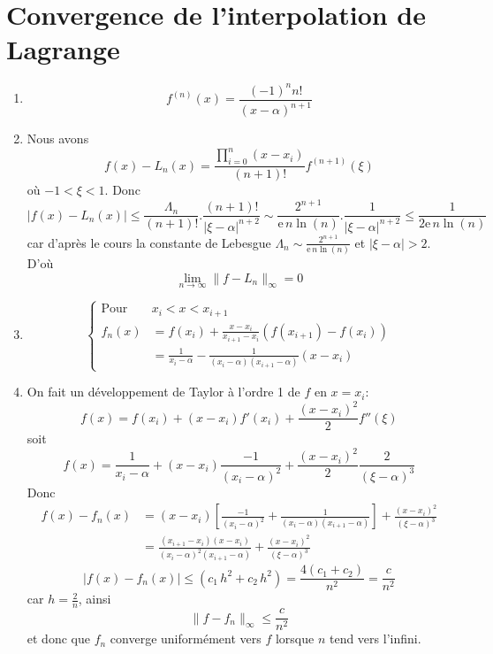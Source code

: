 \documentclass[a4paper]{article}
\begin{document}
\section{Convergence de l'interpolation de Lagrange} 
\begin{enumerate}
\item \[f^{(n)}(x)=\frac{(-1)^n n!}{(x-\alpha)^{n+1}}\]
\item Nous avons
\[f(x) - L_n(x) =\frac{\prod_{i=0}^n\left(x-x_i\right)}{(n + 1)!}f^{(n+1)}(\xi)\]
où  $-1 < \xi < 1$. Donc
\[|f(x)-L_n(x)|\leq \frac{\Lambda_n }{(n + 1)!}.\frac{ (n + 1)!}{|\xi-\alpha|^{n+2}}\sim \frac{2^{n+1}}{\mbox{e}\, n\ln(n)}.\frac{ 1}{|\xi-\alpha|^{n+2}}\leq \frac{1}{2\mbox{e}\, n\ln(n)}\]
car d'après le cours  la constante de Lebesgue $\Lambda_n \sim \frac{2^{n+1}}{\mbox{e}\, n\ln(n)} $ et $|\xi-\alpha|>2$.  
D'où
\[\lim_{n\to \infty}\|f-L_n\|_{\infty}=0\]
\item  \[\left\{\begin{array}{rl}
 \mbox{Pour } &x_i<x<x_{i+1}\\
f_n(x)&=f(x_i)+\frac{x-x_i}{x_{i+1}-x_{i}}\left(f(x_{i+1})-f(x_{i})\right)\\
 &=\frac{1}{x_i-\alpha}-\frac{1}{(x_i-\alpha)(x_{i+1}-\alpha)}(x-x_i)
\end{array}\right.
\]
\item On fait un développement de Taylor à l'ordre 1 de $f$ en $x=x_i$:
\[f(x)=f(x_i)+(x-x_i)f'(x_i)+\frac{(x-x_i)^2}{2}f''(\xi)\]
soit
\[f(x)=\frac{1}{x_i-\alpha}+(x-x_i)\frac{-1}{(x_i-\alpha)^2}+\frac{(x-x_i)^2}{2}\frac{2}{(\xi-\alpha)^{3}}\]
Donc
\[\begin{array}{ll}
f(x)-f_n(x)  &= (x-x_i)\left[\frac{-1}{(x_i-\alpha)^2}+\frac{1}{(x_i-\alpha)(x_{i+1}-\alpha)}\right]+\frac{(x-x_i)^2}{(\xi-\alpha)^{3}}\\
&= \frac{(x_{i+1}-x_i)(x-x_i)}{(x_i-\alpha)^2(x_{i+1}-\alpha)}+\frac{(x-x_i)^2}{(\xi-\alpha)^{3}}
\end{array}
\]
\[|f(x)-f_n(x)|\leq (c_1\,h^2+c_2\,h^2)=\frac{4(c_1+c_2)}{n^2}=\frac{c}{n^2}\]
car $h=\frac 2n$, ainsi
\[\|f-f_n\|_{ \infty}\leq \frac c{n^2}\]
et donc que $f_n$ converge uniformément vers $f$ lorsque $n$ tend vers l'infini.

\end{enumerate}
\end{document}
